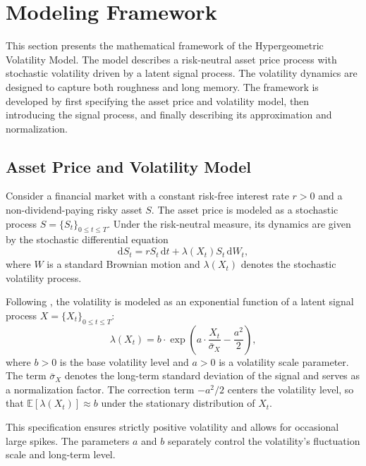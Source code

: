 \section{Modeling Framework} \label{sec:ModelingFramework}

This section presents the mathematical framework of the Hypergeometric Volatility Model. The model describes a risk-neutral asset price process with stochastic volatility driven by a latent signal process. The volatility dynamics are designed to capture both roughness and long memory. The framework is developed by first specifying the asset price and volatility model, then introducing the signal process, and finally describing its approximation and normalization.


\subsection{Asset Price and Volatility Model} \label{subsec:AssetPriceVolatilityModel}

Consider a financial market with a constant risk-free interest rate $r > 0$ and a non-dividend-paying risky asset $S$. The asset price is modeled as a stochastic process $S = \{S_t\}_{0 \leq t \leq T}$. Under the risk-neutral measure, its dynamics are given by the stochastic differential equation
\begin{equation} \label{eq:AssetSDE}
    \mathrm{d} S_t = r S_t \,\mathrm{d}t + \lambda(X_t) S_t \,\mathrm{d}W_t,
\end{equation}
where $W$ is a standard Brownian motion and $\lambda(X_t)$ denotes the stochastic volatility process.

Following \citet{BennedsenLundePakkanen2021}, the volatility is modeled as an exponential function of a latent signal process $X = \{X_t\}_{0 \leq t \leq T}$:
\begin{equation} \label{eq:Volatility}
    \lambda(X_t) = b \cdot \exp \left( a \cdot \frac{X_t}{\bar{\sigma}_X} - \frac{a^2}{2} \right),
\end{equation}
where $b > 0$ is the base volatility level and $a > 0$ is a volatility scale parameter. The term $\bar{\sigma}_X$ denotes the long-term standard deviation of the signal and serves as a normalization factor. The correction term $-a^2/2$ centers the volatility level, so that $\mathbb{E}[\lambda(X_t)] \approx b$ under the stationary distribution of $X_t$.

This specification ensures strictly positive volatility and allows for occasional large spikes. The parameters $a$ and $b$ separately control the volatility’s fluctuation scale and long-term level.


